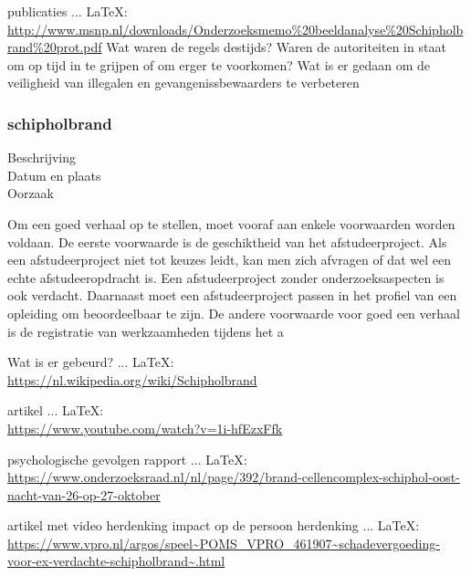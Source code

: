 {{publicaties
 ... \LaTeX:\\ \url{http://www.msnp.nl/downloads/Onderzoeksmemo%20beeldanalyse%20Schipholbrand%20prot.pdf}
Wat waren de regels destijds?
Waren de autoriteiten in staat om op tijd in te grijpen of om erger te voorkomen?
Wat is er gedaan om de veiligheid van illegalen en gevangenissbewaarders te verbeteren



\subsubsection{schipholbrand}

\begin{description}
\item[Beschrijving]
\item[Datum en plaats] 
\item[Oorzaak]
\end{description}
Om een goed verhaal op te stellen, moet vooraf aan enkele voorwaarden
worden voldaan. De eerste voorwaarde is de geschiktheid van het
afstudeerproject. Als een afstudeerproject niet tot keuzes leidt, kan
men zich afvragen of dat wel een echte afstudeeropdracht is. Een
afstudeerproject zonder onderzoeksaspecten is ook verdacht. Daarnaast
moet een afstudeerproject passen in het profiel van een opleiding om
beoordeelbaar te zijn. De andere voorwaarde voor goed een verhaal is
de registratie van werkzaamheden tijdens het a


Wat is er gebeurd?
 ... \LaTeX:\\ \url{https://nl.wikipedia.org/wiki/Schipholbrand}

artikel
 ... \LaTeX:\\ \url{https://www.youtube.com/watch?v=1i-hfEzxFfk}

psychologische gevolgen
rapport
 ... \LaTeX:\\ \url{https://www.onderzoeksraad.nl/nl/page/392/brand-cellencomplex-schiphol-oost-nacht-van-26-op-27-oktober}

artikel met video
herdenking
impact op de persoon
herdenking
 ... \LaTeX:\\ \url{https://www.vpro.nl/argos/speel~POMS_VPRO_461907~schadevergoeding-voor-ex-verdachte-schipholbrand~.html}

}}
